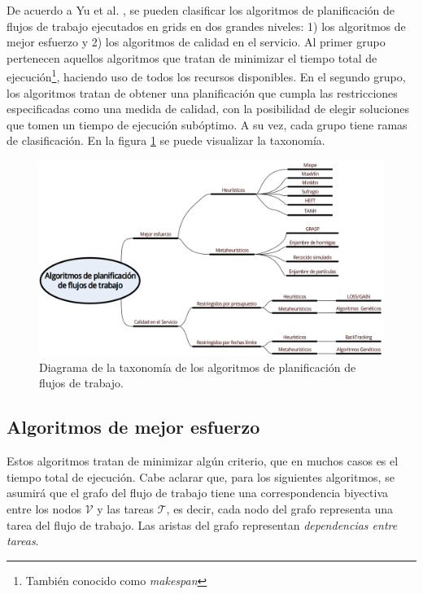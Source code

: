 De acuerdo a Yu et al. \cite{yu2008workflow}, se pueden clasificar los algoritmos de planificación de flujos de trabajo ejecutados en grids en dos grandes niveles: 1) los algoritmos de mejor esfuerzo y 2) los algoritmos de calidad en el servicio. Al primer grupo pertenecen aquellos algoritmos que tratan de minimizar el tiempo total de ejecución\footnote{También conocido como \emph{makespan}}, haciendo uso de todos los recursos disponibles. En el segundo grupo, los algoritmos tratan de obtener una planificación que cumpla las restricciones especificadas como una medida de calidad, con la posibilidad de elegir soluciones que tomen un tiempo de ejecución subóptimo. A su vez, cada grupo tiene ramas de clasificación. En la figura \ref{fig:taxonomy} se puede visualizar la taxonomía.

\begin{figure}
\begin{center}
\includegraphics[width=1.0\textwidth]{imagenes/taxonomy}
\end{center}
\caption{Diagrama de la taxonomía de los algoritmos de planificación de flujos de trabajo.}
\label{fig:taxonomy}
\end{figure}



\subsection{Algoritmos de mejor esfuerzo}
Estos algoritmos tratan de minimizar algún criterio, que en muchos casos es el tiempo total de ejecución. Cabe aclarar que, para los siguientes algoritmos, se asumirá que el grafo del flujo de trabajo tiene una correspondencia biyectiva entre los nodos $\mathcal{V}$ y las tareas $\mathcal{T}$, es decir, cada nodo del grafo representa una tarea del flujo de trabajo. Las aristas del grafo representan \emph{dependencias entre tareas}.

